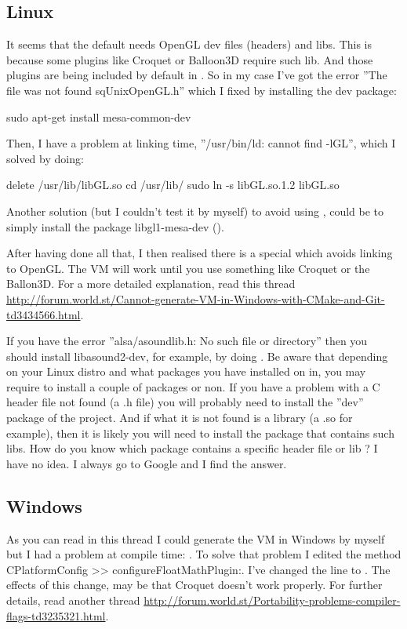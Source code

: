 \documentclass[a4paper,10pt,twoside]{book}
\begin{document}
\subsection{Linux}

It seems that the default  needs OpenGL dev files (headers) and libs. This is because some plugins like Croquet or Balloon3D require such lib. And those plugins are being included by default in . So in my case I've got the error ''The file was not found sqUnixOpenGL.h'' which I fixed by installing the dev package:

\begin{code}{}
sudo apt-get install mesa-common-dev
\end{code}

Then, I have a problem at linking time, ''/usr/bin/ld: cannot find -lGL'', which I solved by doing:

\begin{code}{}
delete /usr/lib/libGL.so
cd /usr/lib/
sudo ln -s libGL.so.1.2 libGL.so
\end{code}

Another solution (but I couldn't test it by myself) to avoid using , could be to simply install the package libgl1-mesa-dev ().

After having done all that, I then realised there is a special    which avoids linking to OpenGL. The VM will work until you use something like Croquet or the Ballon3D. For a more detailed explanation, read this thread \url{http://forum.world.st/Cannot-generate-VM-in-Windows-with-CMake-and-Git-td3434566.html}.

If you have the error ''alsa/asoundlib.h: No such file or directory'' then you should install libasound2-dev, for example, by doing . Be aware that depending on your Linux distro and what packages you have installed on in, you may require to install a couple of packages or non. If you have a problem with a C header file not found (a .h file) you will probably need to install the ''dev'' package of the project. And if what it is not found is a library (a .so for example), then it is likely you will need to install the package that contains such libs. How do you know which package contains a specific header file or lib ? I have no idea. I always go to Google and I find the answer.

\subsection{Windows}
As you can read in this thread I could generate the VM in Windows by myself but I had a problem at compile time: . To solve that problem I edited the method CPlatformConfig >> configureFloatMathPlugin:.  I've changed the line  to . The effects of this change, may be that Croquet doesn't work properly. For further details, read another thread \url{http://forum.world.st/Portability-problems-compiler-flags-td3235321.html}.
\end{document}
